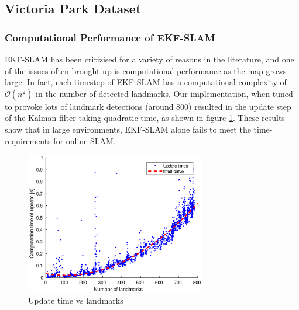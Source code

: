 \subsection{Victoria Park Dataset}
\subsubsection{Computational Performance of EKF-SLAM}
EKF-SLAM has been critizised for a variety of reasons in the literature, and one of the issues often brought up is computational performance as the map grows large. In fact, each timestep of EKF-SLAM has a computational complexity of $\mathcal{O}(n^2)$ in the number of detected landmarks. \cite{divideandconq} Our implementation, when tuned to provoke lots of landmark detections (around 800) resulted in the update step of the Kalman filter taking quadratic time, as shown in figure \ref{fig:update_time_landmarks}. These results show that in large environments, EKF-SLAM alone fails to meet the time-requirements for online SLAM.
\begin{figure}[H]
\centering
\includegraphics[width=0.7\textwidth]{plots/a3/update-time-vs-landmarks}
\caption{Update time vs landmarks}
\label{fig:update_time_landmarks}
\end{figure}


